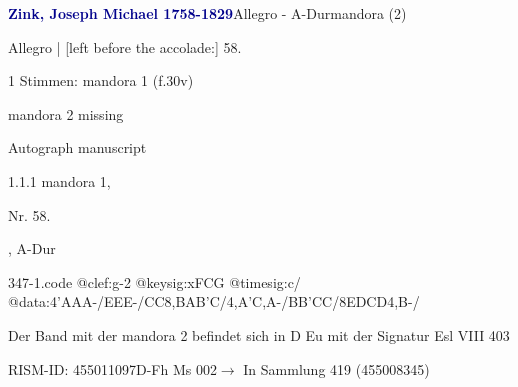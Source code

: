 \documentclass[twocolumn, 12pt]{book}
\begin{document}
\par \vspace{16pt} \textcolor{darkblue}{\textbf{Zink, Joseph Michael  1758-1829}}\hfillplus{\textbf{[347]}}\newline Allegro - A-Dur\newline mandora (2)
\par \begin{itshape}[f.30v, at left:] Allegro | [left before the accolade:] 58.\end{itshape} 
\par \textcolor{darkblue}{}  1 Stimmen: mandora 1  (f.30v)\newline \begin{small} mandora 2 missing\end{small} \newline Autograph manuscript
\par 1.1.1  mandora 1, \begin{itshape}Nr. 58.\end{itshape}, A-Dur  
\begin{filecontents*}{347-1.code}
@clef:g-2
@keysig:xFCG
@timesig:c/
@data:4'AAA-/EEE-/CC8,BAB'C/4,A'C,A-/BB'CC/8EDCD4,B-/
\end{filecontents*}
\newline %
\par Der Band mit der mandora 2 befindet sich in D Eu mit der Signatur Esl VIII 403
\par RISM-ID: 455011097\newline D-Fh  Ms 002\newline $\rightarrow$ In Sammlung 419 (455008345)
      
\end{document}
